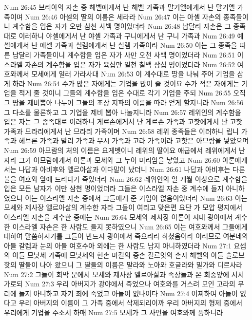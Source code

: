 Num 26:45  브리아의 자손 중 헤벨에게서 난 헤벨 가족과 말기엘에게서 난 말기엘 가족이며
Num 26:46  아셀의 딸의 이름은 세라라
Num 26:47  이는 아셀 자손의 종족들이니 계수함을 입은 자가 오만 삼천 사백 명이었더라
Num 26:48  납달리 자손은 그 종족대로 이러하니 야셀에게서 난 야셀 가족과 구니에게서 난 구니 가족과
Num 26:49  예셀에게서 난 예셀 가족과 실렘에게서 난 실렘 가족이라
Num 26:50  이는 그 종족을 따른 납달리 가족들이니 계수함을 입은 자가 사만 오천 사백 명이었더라
Num 26:51  이스라엘 자손의 계수함을 입은 자가 육십만 일천 칠백 삼십 명이었더라
Num 26:52  여호와께서 모세에게 일러 가라사대
Num 26:53  이 계수대로 땅을 나눠 주어 기업을 삼게 하라
Num 26:54  수가 많은 자에게는 기업을 많이 줄 것이요 수가 적은 자에게는 기업을 적게 줄 것이니 그들의 계수함을 입은 수대로 각기 기업을 주되
Num 26:55  오직 그 땅을 제비뽑아 나누어 그들의 조상 지파의 이름을 따라 얻게 할지니라
Num 26:56  그 다소를 물론하고 그 기업을 제비 뽑아 나눌지니라
Num 26:57  레위인의 계수함을 입은 자는 그 종족대로 이러하니 게르손에게서 난 게르손 가족과 고핫에게서 난 고핫 가족과 므라리에게서 난 므라리 가족이며
Num 26:58  레위 종족들은 이러하니 립니 가족과 헤브론 가족과 말리 가족과 무시 가족과 고라 가족이라 고핫은 아므람을 낳았으며
Num 26:59  아므람의 처의 이름은 요게벳이니 레위의 딸이요 애굽에서 레위에게서 난 자라 그가 아므람에게서 아론과 모세와 그 누이 미리암을 낳았고
Num 26:60  아론에게서는 나답과 아비후와 엘르아살과 이다말이 났더니
Num 26:61  나답과 아비후는 다른 불을 여호와 앞에 드리다가 죽었더라
Num 26:62  레위인의 일 개월 이상으로 계수함을 입은 모든 남자가 이만 삼천 명이었더라 그들은 이스라엘 자손 중 계수에 들지 아니하였으니 이는 이스라엘 자손 중에서 그들에게 준 기업이 없음이었더라
Num 26:63  이는 모세와 제사장 엘르아살의 계수한 자라 그들이 여리고 맞은편 요단 가 모압 평지에서 이스라엘 자손을 계수한 중에는
Num 26:64  모세와 제사장 아론이 시내 광야에서 계수한 이스라엘 자손은 한 사람도 들지 못하였으니
Num 26:65  이는 여호와께서 그들에게 대하여 말씀하시기를 그들이 반드시 광야에서 죽으리라 하셨음이라 이러므로 여분네의 아들 갈렙과 눈의 아들 여호수아 외에는 한 사람도 남지 아니하였더라
Num 27:1  요셉의 아들 므낫세 가족에 므낫세의 현손 마길의 증손 길르앗의 손자 헤벨의 아들 슬로브핫의 딸들이 나아 왔으니 그 딸들의 이름은 말라와 노아와 호글라와 밀가와 디르사라
Num 27:2  그들이 회막 문에서 모세와 제사장 엘르아살과 족장들과 온 회중앞에 서서 가로되
Num 27:3  우리 아버지가 광야에서 죽었으나 여호와를 거스려 모인 고라의 무리에 들지 아니하고 자기 죄에 죽었고 아들이 없나이다
Num 27:4  어찌하여 아들이 없다고 우리 아버지의 이름이 그 가족 중에서 삭제되리이까 우리 아버지의 형제 중에서 우리에게 기업을 주소서 하매
Num 27:5  모세가 그 사연을 여호와께 품하니라
